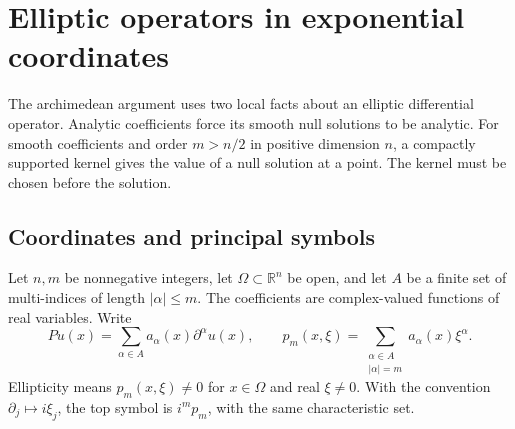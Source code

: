 \section{Elliptic operators in exponential coordinates}\label{sec:g443}

The archimedean argument uses two local facts about an elliptic differential
operator. Analytic coefficients force its smooth null solutions to be analytic.
For smooth coefficients and order \(m>n/2\) in positive dimension \(n\),
a compactly supported kernel gives the value of a null solution at a point.
The kernel must be chosen before the solution.

\subsection{Coordinates and principal symbols}
Let \(n,m\) be nonnegative integers, let \(\Omega\subset\mathbb R^n\) be open, and let \(A\) be a
finite set of multi-indices of length \(|\alpha|\leq m\). The coefficients are
complex-valued functions of real variables. Write
\begin{equation}\label{eq:g443-operator}
 Pu(x)=\sum_{\alpha\in A}a_\alpha(x)\partial^\alpha u(x),\qquad
 p_m(x,\xi)=\sum_{\substack{\alpha\in A\\|\alpha|=m}}a_\alpha(x)\xi^\alpha .
\end{equation}
Ellipticity means \(p_m(x,\xi)\ne0\) for \(x\in\Omega\) and real
\(\xi\ne0\). With the convention \(\partial_j\mapsto i\xi_j\), the top
symbol is \(i^m p_m\), with the same characteristic set.

